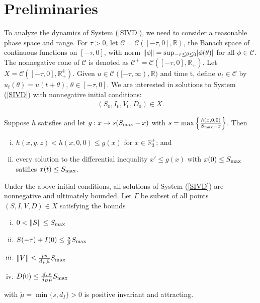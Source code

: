 \documentclass{CMHPhD-SIVD}
\begin{document}
\section{Preliminaries}
To analyze the dynamics of System (\ref{SIVD}), we need to consider a reasonable phase space and range. For $\tau>0$, let $\mathscr{C}=\mathcal{C}([-\tau,0],\mathbb{R})$, the Banach space of continuous functions on $[-\tau,0]$, with norm $\|\phi\|=\rm sup_{-\tau\leq\theta\leq0}|\phi(\theta)|$ for all $\phi\in\mathscr{C}$. The nonnegative cone of $\mathscr{C}$ is denoted as $\mathscr{C}^+=\mathcal{C}([-\tau,0],\mathbb{R}_+)$. Let $X=\mathcal{C}([-\tau,0],\mathbb{R}^4_+)$. Given $u\in\mathcal{C}([-\tau,\infty),\mathbb{R})$ and time t, define $u_t\in\mathscr{C}$ by $u_t(\theta) = u(t+\theta)$, $\theta\in[-\tau,0]$.
We are interested in solutions to System (\ref{SIVD}) with nonnegative initial conditions:
\begin{align*}
(S_0, I_0, V_0, D_0) \in X.
\end{align*}

\begin{lemma}\label{2.1}
Suppose $h$ satisfies 
and let $g:x\to s(S_{\text{max}}-x)$ with $s=\max\left\{\frac{h(x,0,0)}{S_{\text{max}}-x}\right\}$.
Then
	\begin{enumerate}[(i)]
		\item $h(x,y,z)<h(x, 0, 0)\leq g(x)$ for $x\in\mathbb{R}_3^+$; and
		\item every solution to the differential inequality $x'\leq g(x)$ with $x(0)\leq S_{\text{max}}$ satifies $x(t)\leq S_{\text{max}}$.
	\end{enumerate}
\end{lemma}


\begin{proposition}  Under the above initial conditions, all solutions of System (\ref{SIVD}) are nonnegative and ultimately bounded.
Let $\Gamma$ be subset of all points $(S, I, V, D) \in X$ satisfying the bounds

\begin{enumerate}[(i)]
	\item $0<\|S\|\leq S_{\text{max}}$
	\item $S(-\tau)+I(0)\leq\frac{s}{\tilde{\mu}} S_{\text{max}}$
	\item $\|V\|\leq\frac{ p s}{d_V\tilde{\mu}} S_{\text{max}}$
	\item $D(0)\leq\frac{d_I s}{d_D\tilde{\mu}} S_{\text{max}}$
\end{enumerate}
with $\tilde{\mu}=\min\{s,d_I\}>0$ is positive invariant and attracting.
\end{proposition}
\end{document}
